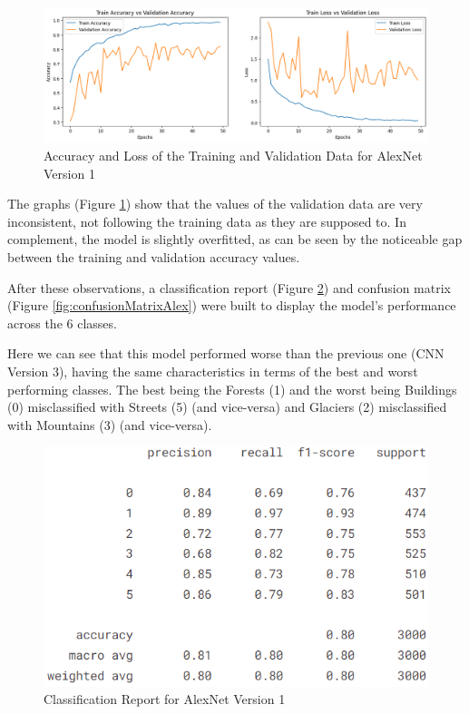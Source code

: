 \documentclass[conference]{IEEEtran}
\begin{document}
\begin{figure}[H]
    \centering
    \includegraphics[width=1\linewidth]{images/acc_loss_alex_1.png}
    \caption{Accuracy and Loss of the Training and Validation Data for
    AlexNet Version 1}
    \label{fig:accuracyLossAlexNet1}
\end{figure}

The graphs (Figure \ref{fig:accuracyLossAlexNet1}) show that the values of the validation data are very inconsistent, not following the training data as they are supposed to. In complement, the model is slightly overfitted, as can be seen by the noticeable gap between the training and validation accuracy values.

After these observations, a classification report (Figure \ref{fig:classReportAlex}) and confusion matrix (Figure \ref{fig:confusionMatrixAlex}) were built to display the model's performance across the 6 classes.

Here we can see that this model performed worse than the previous one (CNN Version 3), having the same characteristics in terms of the best and worst performing classes. The best being the Forests (1) and the worst being Buildings (0) misclassified with Streets (5) (and vice-versa) and Glaciers (2) misclassified with Mountains (3) (and vice-versa).

\begin{figure}[H]
    \centering
    \includegraphics[width=0.8\linewidth]{images/alex_class_report_1.png}
    \caption{Classification Report for AlexNet Version 1}
    \label{fig:classReportAlex}
\end{figure}
\end{document}
